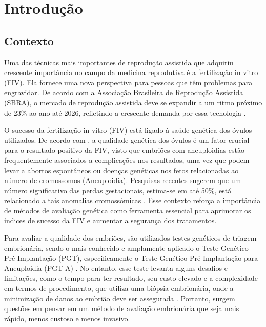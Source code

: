 \chapter[Introdução]{Introdução}

\section{Contexto}

Uma das técnicas mais importantes de reprodução assistida que adquiriu crescente importância no campo da medicina reprodutiva é a fertilização in vitro (FIV). Ela fornece uma nova perspectiva para pessoas que têm problemas para engravidar. De acordo com a Associação Brasileira de Reprodução Assistida (SBRA), o mercado de reprodução assistida deve se expandir a um ritmo próximo de 23\% ao ano até 2026, refletindo a crescente demanda por essa tecnologia \cite{sbra2024}.

O sucesso da fertilização in vitro (FIV) está ligado à saúde genética dos óvulos utilizados. De acordo com , a qualidade genética dos óvulos é um fator crucial para o resultado positivo da FIV, visto que embriões com aneuploidias estão frequentemente associados a complicações nos resultados, uma vez que podem levar a abortos espontâneos ou doenças genéticas nos fetos relacionadas ao número de cromossomos (Aneuploidia). Pesquisas recentes sugerem que um número significativo das perdas gestacionais, estima-se em até 50\%, está relacionado a tais anomalias cromossômicas \cite{scienceofbiogenetics2024}. Esse contexto reforça a importância de métodos de avaliação genética como ferramenta essencial para aprimorar os índices de sucesso da FIV e aumentar a segurança dos tratamentos.

Para avaliar a qualidade dos embriões, são utilizados testes genéticos de triagem embrionária, sendo o mais conhecido e amplamente aplicado o Teste Genético Pré-Implantação (PGT), especificamente o Teste Genético Pré-Implantação para Aneuploidia (PGT-A) \cite{yang2024}. No entanto, esse teste levanta alguns desafios e limitações, como o tempo para ter resultado, seu custo elevado e a complexidade em termos de procedimento, que utiliza uma biópsia embrionária, onde a minimização de danos ao embrião deve ser assegurada \cite{yang2024}. Portanto, surgem questões em pensar em um método de avaliação embrionária que seja mais rápido,  menos custoso e menos invasivo. 


